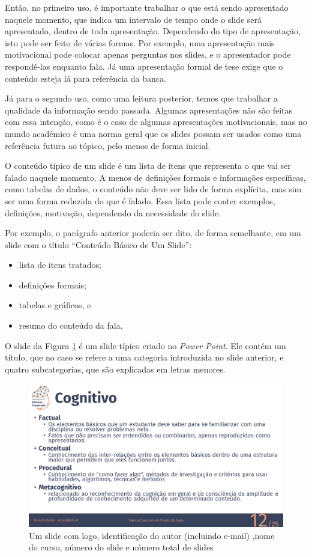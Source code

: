Então, no primeiro uso, é importante trabalhar o que está sendo apresentado naquele momento, que indica um intervalo de tempo onde o slide será apresentado, dentro de toda apresentação. Dependendo do tipo de apresentação, isto pode ser feito de várias formas. Por exemplo, uma apresentação mais motivacional pode colocar apenas perguntas nos slides, e o apresentador pode respondê-las enquanto fala. Já uma apresentação formal de tese exige que o conteúdo esteja lá para referência da banca.

Já para o segundo uso, como uma leitura posterior, temos que trabalhar a qualidade da informação sendo passada. Algumas apresentações não são feitas com essa intenção, como é o caso de algumas apresentações motivacionais, mas no mundo acadêmico é uma norma geral que os slides possam ser usados como uma referência futura ao tópico, pelo menos de forma inicial.

O conteúdo típico de um slide é um lista de itens  que representa o que vai ser falado naquele momento. A menos de definições formais e informações específicas, como tabelas de dados, o conteúdo não deve ser lido de forma explícita, mas sim ser uma forma reduzida do que é falado.  Essa lista pode conter exemplos, definições, motivação, dependendo da necessidade do slide.

Por exemplo, o parágrafo anterior poderia ser dito, de forma semelhante, em um slide com o título ``Conteúdo Básico de Um Slide'':
\begin{itemize}
    \item lista de itens tratados;
    \item definições formais;
    \item tabelas e gráficos, e
    \item resumo do conteúdo da fala.
\end{itemize}

O slide da Figura \ref{fig:coppe} é um slide típico criado no \textit{Power Point}. Ele contém um título, que no caso se refere a uma categoria introduzida no slide anterior, e quatro subcategorias, que são explicadas em letras menores.

\begin{figure}[htb]
    \centering
    \includegraphics[width=\tam\linewidth,frame]{imagens/slideexemplotepj.png}
    \caption{Um slide com logo, identificação do autor (incluindo e-mail) ,nome do curso,   número do slide e número total de slides}
    \label{fig:coppe}
\end{figure}


